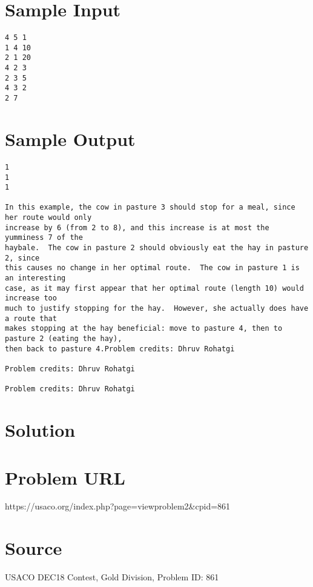 \documentclass[12pt]{article}
\begin{document}
\section*{Sample Input}
\begin{verbatim}
4 5 1
1 4 10
2 1 20
4 2 3
2 3 5
4 3 2
2 7
\end{verbatim}

\section*{Sample Output}
\begin{verbatim}
1
1
1

In this example, the cow in pasture 3 should stop for a meal, since her route would only
increase by 6 (from 2 to 8), and this increase is at most the yumminess 7 of the
haybale.  The cow in pasture 2 should obviously eat the hay in pasture 2, since
this causes no change in her optimal route.  The cow in pasture 1 is an interesting
case, as it may first appear that her optimal route (length 10) would increase too
much to justify stopping for the hay.  However, she actually does have a route that
makes stopping at the hay beneficial: move to pasture 4, then to pasture 2 (eating the hay),
then back to pasture 4.Problem credits: Dhruv Rohatgi

Problem credits: Dhruv Rohatgi

Problem credits: Dhruv Rohatgi
\end{verbatim}

\section*{Solution}


\section*{Problem URL}
https://usaco.org/index.php?page=viewproblem2&cpid=861

\section*{Source}
USACO DEC18 Contest, Gold Division, Problem ID: 861
\end{document}
